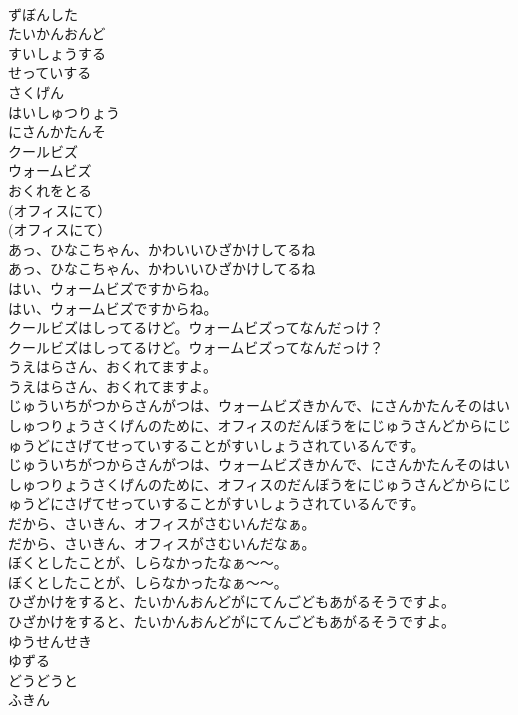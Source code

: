 \documentclass[8pt]{extreport}
\begin{document}
\begin{CJK}{UTF8}{min}
\\	ずぼんした
\\	たいかんおんど
\\	すいしょうする
\\	せっていする
\\	さくげん
\\	はいしゅつりょう
\\	にさんかたんそ
\\	クールビズ
\\	ウォームビズ
\\	おくれをとる
\\	(オフィスにて）
\\	(オフィスにて）
\\	あっ、ひなこちゃん、かわいいひざかけしてるね
\\	あっ、ひなこちゃん、かわいいひざかけしてるね
\\	はい、ウォームビズですからね。
\\	はい、ウォームビズですからね。
\\	クールビズはしってるけど。ウォームビズってなんだっけ？
\\	クールビズはしってるけど。ウォームビズってなんだっけ？
\\	うえはらさん、おくれてますよ。
\\	うえはらさん、おくれてますよ。
\\	じゅういちがつからさんがつは、ウォームビズきかんで、にさんかたんそのはいしゅつりょうさくげんのために、オフィスのだんぼうをにじゅうさんどからにじゅうどにさげてせっていすることがすいしょうされているんです。
\\	じゅういちがつからさんがつは、ウォームビズきかんで、にさんかたんそのはいしゅつりょうさくげんのために、オフィスのだんぼうをにじゅうさんどからにじゅうどにさげてせっていすることがすいしょうされているんです。
\\	だから、さいきん、オフィスがさむいんだなぁ。
\\	だから、さいきん、オフィスがさむいんだなぁ。
\\	ぼくとしたことが、しらなかったなぁ～～。
\\	ぼくとしたことが、しらなかったなぁ～～。
\\	ひざかけをすると、たいかんおんどがにてんごどもあがるそうですよ。
\\	ひざかけをすると、たいかんおんどがにてんごどもあがるそうですよ。
\\	ゆうせんせき
\\	ゆずる
\\	どうどうと
\\	ふきん

\end{CJK}
\end{document}
